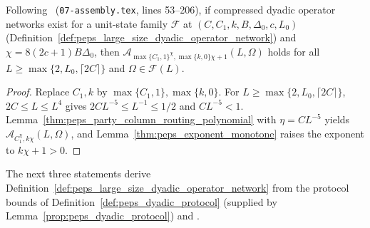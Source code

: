 \begin{theorem}
    \label{thm:peps_ground_state_approximation_conditional}
    \leanok
    Following~\cite[Section~8]{OpenAI2026PolynomialPEPS}
    (\texttt{07-assembly.tex}, lines 53--206), if compressed dyadic operator
    networks exist for a unit-state family $\mathcal F$ at
    $(C,C_1,k,B,\Delta_0,c,L_0)$
    (Definition~\ref{def:peps_large_size_dyadic_operator_network}) and
    $\chi=8(2c+1)B\Delta_0$, then
    $\mathcal A_{\max\{C_1,1\}^\chi,\max\{k,0\}\chi+1}(L,\Omega)$ holds for
    all $L\ge\max\{2,L_0,\lceil2C\rceil\}$ and $\Omega\in\mathcal F(L)$.
\end{theorem}
\begin{proof}
    \leanok
    Replace $C_1,k$ by $\max\{C_1,1\},\max\{k,0\}$. For
    $L\ge\max\{2,L_0,\lceil2C\rceil\}$, $2C\le L\le L^4$ gives
    $2CL^{-5}\le L^{-1}\le1/2$ and $CL^{-5}<1$.
    Lemma~\ref{thm:peps_party_column_routing_polynomial} with $\eta=CL^{-5}$
    yields $\mathcal A_{C_1^\chi,k\chi}(L,\Omega)$, and
    Lemma~\ref{thm:peps_exponent_monotone} raises the exponent to
    $k\chi+1>0$.
\end{proof}

The next three statements derive
Definition~\ref{def:peps_large_size_dyadic_operator_network} from the protocol
bounds of Definition~\ref{def:peps_dyadic_protocol}
(supplied by Lemma~\ref{prop:peps_dyadic_protocol}) and
\cite[Proposition~7.1, Theorem~5.2, and Section~8.1]{OpenAI2026PolynomialPEPS}.

